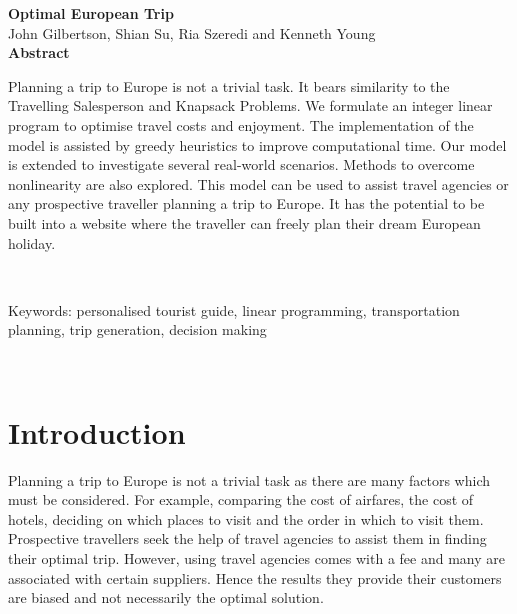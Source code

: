 \documentclass[12pt]{article}
\begin{document}
\clearpage
\vspace*{3cm}
\begin{center}
  {\LARGE \bf Optimal European Trip}\\[+10pt]
  John Gilbertson, Shian Su, Ria Szeredi and Kenneth Young\\[+10pt]
  {\large \bf Abstract}\\[+10pt]
  \parbox{13cm}{Planning a trip to Europe is not a trivial task. It bears similarity to the Travelling Salesperson and Knapsack Problems. We formulate an integer linear program to optimise travel costs and enjoyment. The implementation of the model is assisted by greedy heuristics to improve computational time. Our model is extended to investigate several real-world scenarios. Methods to overcome nonlinearity are also explored. This model can be used to assist travel agencies or any prospective traveller planning a trip to Europe. It has the potential to be built into a website where the traveller can freely plan their dream European holiday.}
\\[+20pt]
\parbox{13cm}{
Keywords: personalised tourist guide, linear programming, transportation planning, trip generation, decision making}
\\[+20pt]
\end{center}
\vfill
\clearpage

\tableofcontents
\pagebreak


\section{Introduction}
\label{sec:intro}


Planning a trip to Europe is not a trivial task as there are many factors which must be considered. For example, comparing the cost of airfares, the cost of hotels, deciding on which places to visit and the order in which to visit them. Prospective travellers seek the help of travel agencies to assist them in finding their optimal trip. However, using travel agencies comes with a fee and many are associated with certain suppliers. Hence the results they provide their customers are biased and not necessarily the optimal solution.
\end{document}
